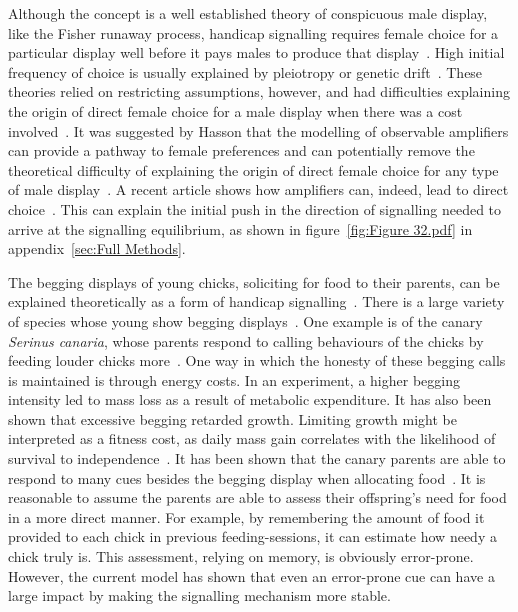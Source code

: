 \documentclass[a4paper,12pt]{article}
\numberwithin{equation}{section}
\begin{document}
Although the concept is a well established theory of conspicuous male display, like the Fisher runaway process, handicap signalling requires female choice for a particular display well before it pays males to produce that display~\cite{Kirkpatrick1982}. High initial frequency of choice is usually explained by pleiotropy or genetic drift~\cite{Kirkpatrick1982, Heisler1984}. These theories relied on restricting assumptions, however, and had difficulties explaining the origin of direct female choice for a male display when there was a cost involved~\cite{Pomiankowski1987}. It was suggested by Hasson that the modelling of observable amplifiers can provide a pathway to female preferences and can potentially remove the theoretical difficulty of explaining the origin of direct female choice for any type of male display~\cite{Hasson1989}. A recent article shows how amplifiers can, indeed, lead to direct choice~\cite{Bogaardt2014}. This can explain the initial push in the direction of signalling needed to arrive at the signalling equilibrium, as shown in figure~\ref{fig:Figure 32.pdf} in appendix~\ref{sec:Full Methods}.

The begging displays of young chicks, soliciting for food to their parents, can be explained theoretically as a form of handicap signalling~\cite{Godfray1991}. There is a large variety of species whose young show begging displays~\cite{Kilner1997}. One example is of the canary \textit{Serinus canaria}, whose parents respond to calling behaviours of the chicks by feeding louder chicks more~\cite{Kilner1995}. One way in which the honesty of these begging calls is maintained is through energy costs. In an experiment, a higher begging intensity led to mass loss as a result of metabolic expenditure. It has also been shown that excessive begging retarded growth. Limiting growth might be interpreted as a fitness cost, as daily mass gain correlates with the likelihood of survival to independence~\cite{Kilner2001}. It has been shown that the canary parents are able to respond to many cues besides the begging display when allocating food~\cite{Kilner1995}. It is reasonable to assume the parents are able to assess their offspring's need for food in a more direct manner. For example, by remembering the amount of food it provided to each chick in previous feeding-sessions, it can estimate how needy a chick truly is. This assessment, relying on memory, is obviously error-prone. However, the current model has shown that even an error-prone cue can have a large impact by making the signalling mechanism more stable.
\end{document}
